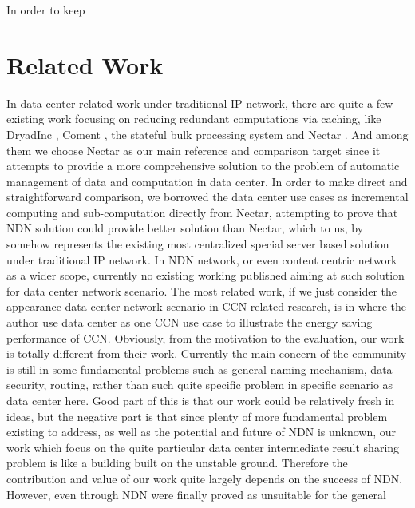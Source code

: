 \documentclass[journal]{IEEEtran}
\begin{document}
In order to keep

\section{Related Work}
In data center related work under traditional IP network, there are quite a few
existing work focusing on reducing redundant computations via caching, like
DryadInc \cite{Isard:2007:DDD:1272996.1273005}, Coment
\cite{He:2010:CBS:1807128.1807139}, the stateful bulk processing system
\cite{Logothetis:2010:SBP:1807128.1807138} and Nectar
\cite{gunda2010nectar}. And among them we choose Nectar as our main reference
and comparison target since it attempts to provide a more comprehensive solution
to the problem of automatic management of data and computation in data
center. In order to make direct and straightforward comparison, we borrowed the
data center use cases as incremental computing and sub-computation directly from
Nectar, attempting to prove that NDN solution could provide better solution than
Nectar, which to us, by somehow represents the existing most centralized special
server based solution under traditional IP network.  In NDN network, or even
content centric network as a wider scope, currently no existing working
published aiming at such solution for data center network scenario. The most
related work, if we just consider the appearance data center network scenario in
CCN related research, is in \cite{lee2010greening} where the author use data
center as one CCN use case to illustrate the energy saving performance of
CCN. Obviously, from the motivation to the evaluation, our work is totally
different from their work.  Currently the main concern of the community is still
in some fundamental problems such as general naming mechanism, data security,
routing, rather than such quite specific problem in specific scenario as data
center here. Good part of this is that our work could be relatively fresh in
ideas, but the negative part is that since plenty of more fundamental problem
existing to address, as well as the potential and future of NDN is unknown, our
work which focus on the quite particular data center intermediate result sharing
problem is like a building built on the unstable ground. Therefore the
contribution and value of our work quite largely depends on the success of
NDN. However, even through NDN were finally proved as unsuitable for the general
\end{document}
